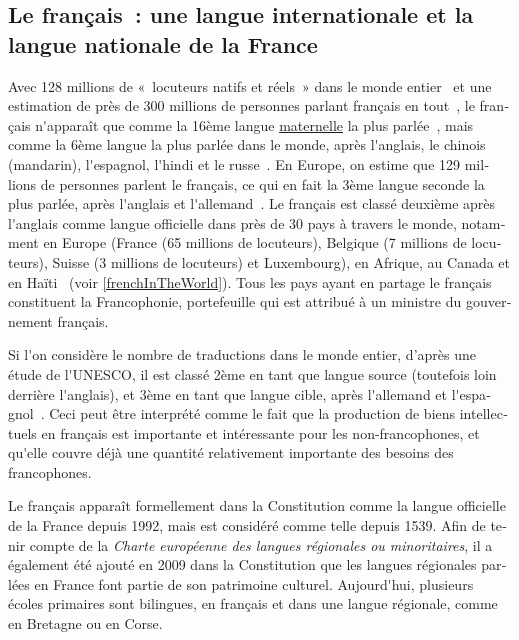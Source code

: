 \begin{french}
\clearpage



\begin{multicols}{2}

\subsection{Le français~: une langue internationale et la langue nationale de la France}
Avec 128 millions de «~locuteurs natifs et réels~» dans le monde
entier~\cite{native} et une estimation de près de 300 millions de
personnes parlant français en tout~\cite{francais}, le français
n{\mbox '}apparaît que comme la 16ème langue \underline{maternelle} la plus
parlée~\cite{Lewis2009}, mais comme la 6ème langue la plus parlée dans
le monde, après l{\mbox '}anglais, le chinois (mandarin), l{\mbox '}espagnol, l{\mbox '}hindi et
le russe~\cite{russe}. En Europe, on estime que 129 millions de
personnes parlent le français, ce qui en fait la 3ème langue seconde la
plus parlée, après l{\mbox '}anglais et l{\mbox '}allemand~\cite{francais}. Le français est classé
deuxième après l{\mbox '}anglais comme langue officielle dans près de 30 pays
à travers le monde, notamment en Europe (France (65 millions de
locuteurs), Belgique (7 millions de locuteurs), Suisse (3 millions de
locuteurs) et Luxembourg), en Afrique, au Canada et en
Haïti~\cite{haiti} (voir \ref{frenchInTheWorld}). Tous les pays ayant en partage le
français constituent la Francophonie, portefeuille qui est attribué à
un ministre du gouvernement français.

Si l{\mbox '}on considère le nombre de traductions dans le monde
entier, d'après une étude de l{\mbox '}UNESCO, il est classé 2ème en
tant que langue source (toutefois loin derrière l{\mbox '}anglais), et
3ème en tant que langue cible, après l{\mbox '}allemand et l{\mbox
 '}espagnol~\cite{espagnol}. Ceci peut être interprété comme le fait
que la production de biens intellectuels en français est importante et
intéressante pour les non-francophones, et qu{\mbox '}elle couvre déjà
une quantité relativement importante des besoins des francophones.

Le français apparaît formellement dans la Constitution comme la langue
officielle de la France depuis 1992, mais est considéré comme telle
depuis 1539. Afin de tenir compte de la {\em Charte européenne des langues
régionales ou minoritaires}, il a également été ajouté en 2009 dans la
Constitution que les langues régionales parlées en France font partie
de son patrimoine culturel. Aujourd{\mbox '}hui, plusieurs écoles primaires
sont bilingues, en français et dans une langue régionale, comme en
Bretagne ou en Corse.


\end{multicols}
\end{french}
